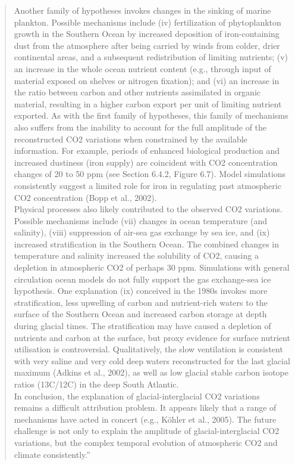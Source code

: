 \documentclass[amstex,12pt]{book}
\begin{document}
\begin{quotation}
	Another family of hypotheses invokes changes in the sinking of marine plankton. Possible mechanisms include (iv) fertilization of phytoplankton growth in the Southern Ocean by increased deposition of iron-containing dust from the atmosphere after being carried by winds from colder, drier continental areas, and a subsequent redistribution of limiting nutrients; (v) an increase in the whole ocean nutrient content (e.g., through input of material exposed on shelves or nitrogen fixation); and (vi) an increase in the ratio between carbon and other nutrients assimilated in organic material, resulting in a higher carbon export per unit of limiting nutrient exported. As with the first family of hypotheses, this family of mechanisms also suffers from the inability to account for the full amplitude of the reconstructed CO2 variations when constrained by the available information. For example, periods of enhanced biological production and increased dustiness (iron supply) are coincident with CO2 concentration changes of 20 to 50 ppm (see Section 6.4.2, Figure 6.7). Model simulations consistently suggest a limited role for iron in regulating past atmospheric CO2 concentration (Bopp et al., 2002).\\
	Physical processes also likely contributed to the observed CO2 variations. Possible mechanisms include (vii) changes in ocean temperature (and salinity), (viii) suppression of air-sea gas exchange by sea ice, and (ix) increased stratification in the Southern Ocean. The combined changes in temperature and salinity increased the solubility of CO2, causing a depletion in atmospheric CO2 of perhaps 30 ppm. Simulations with general circulation ocean models do not fully support the gas exchange-sea ice hypothesis. One explanation (ix) conceived in the 1980s invokes more stratification, less upwelling of carbon and nutrient-rich waters to the surface of the Southern Ocean and increased carbon storage at depth during glacial times. The stratification may have caused a depletion of nutrients and carbon at the surface, but proxy evidence for surface nutrient utilisation is controversial. Qualitatively, the slow ventilation is consistent with very saline and very cold deep waters reconstructed for the last glacial maximum (Adkins et al., 2002), as well as low glacial stable carbon isotope ratios (13C/12C) in the deep South Atlantic.\\
	In conclusion, the explanation of glacial-interglacial CO2 variations remains a difficult attribution problem. It appears likely that a range of mechanisms have acted in concert (e.g., Köhler et al., 2005). The future challenge is not only to explain the amplitude of glacial-interglacial CO2 variations, but the complex temporal evolution of atmospheric CO2 and climate consistently.”
\end{quotation}
\end{document}
